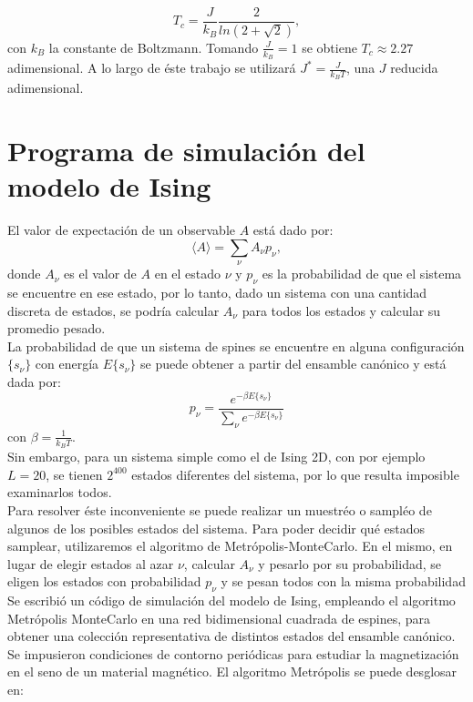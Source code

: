 \documentclass[%
 reprint,
 amsmath,amssymb,
 aps,
spanish]{revtex4-1}
\begin{document}
\begin{equation}
T_c = \frac{J}{k_B}\frac{2}{ln(2+\sqrt{2})},
\label{T_c}
\end{equation}
con $k_B$ la constante de Boltzmann. Tomando $\frac{J}{k_B}=1$ se obtiene $T_c\approx2.27$ adimensional. A lo largo de éste trabajo se utilizará $J^*=\frac{J}{k_BT}$, una $J$ reducida adimensional.

\section{Programa de simulación del modelo de Ising}
El valor de expectación de un observable $A$ está dado por:
\begin{equation}
\langle A \rangle=\sum_{\nu}{A_{\nu}p_{\nu}},
\label{A}
\end{equation}
donde $A_{\nu}$ es el valor de $A$ en el estado $\nu$ y $p_{\nu}$ es la probabilidad de que el sistema se encuentre en ese estado, por lo tanto, dado un sistema con una cantidad discreta de estados, se podría calcular $A_{\nu}$ para todos los estados y calcular su promedio pesado.\\
La probabilidad de que un sistema de spines se encuentre en alguna configuración $\{s_\nu\}$ con energía $E\{s_\nu\}$ se puede obtener a partir del ensamble canónico y está dada por:
\begin{equation}
p_{\nu}=\frac{e^{-\beta E\{s_{\nu}\}}}{\sum_{\nu}e^{-\beta E\{s_{\nu}\}}}
\label{p_nu}
\end{equation}
con $\beta=\frac{1}{k_BT}$.\\
Sin embargo, para un sistema simple como el de Ising 2D, con  por ejemplo $L=20$, se tienen $2^{400}$ estados diferentes del sistema, por lo que resulta imposible examinarlos todos.\\
Para resolver éste inconveniente se puede realizar un muestréo o sampléo de algunos de los posibles estados del sistema. Para poder decidir qué estados samplear, utilizaremos el algoritmo de Metrópolis-MonteCarlo. En el mismo, en lugar de elegir estados al azar $\nu$, calcular $A_{\nu}$ y pesarlo por su probabilidad, se eligen los estados con probabilidad $p_{\nu}$ y se pesan todos con la misma probabilidad\\
Se escribió un código de simulación del modelo de Ising, empleando el algoritmo Metrópolis MonteCarlo en una red bidimensional cuadrada de espines, para obtener una colección representativa de distintos estados del ensamble canónico. Se impusieron condiciones de contorno periódicas para estudiar la magnetización en el seno de un material magnético.
El algoritmo Metrópolis se puede desglosar en:
\end{document}
